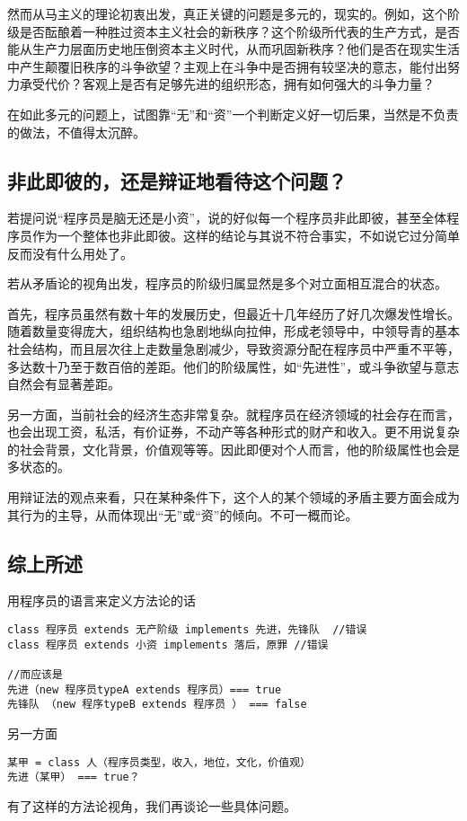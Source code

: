 \documentclass[punct=kaiming, zihao=5, openany, fontset=sikou]{ctexbook}
\begin{document}
然而从马主义的理论初衷出发，真正关键的问题是多元的，现实的。例如，这个阶级是否酝酿着一种胜过资本主义社会的新秩序？这个阶级所代表的生产方式，是否能从生产力层面历史地压倒资本主义时代，从而巩固新秩序？他们是否在现实生活中产生颠覆旧秩序的斗争欲望？主观上在斗争中是否拥有较坚决的意志，能付出努力承受代价？客观上是否有足够先进的组织形态，拥有如何强大的斗争力量？

在如此多元的问题上，试图靠“无”和“资”一个判断定义好一切后果，当然是不负责的做法，不值得太沉醉。

\subsection{非此即彼的，还是辩证地看待这个问题？}
若提问说“程序员是脑无还是小资”，说的好似每一个程序员非此即彼，甚至全体程序员作为一个整体也非此即彼。这样的结论与其说不符合事实，不如说它过分简单反而没有什么用处了。

若从矛盾论的视角出发，程序员的阶级归属显然是多个对立面相互混合的状态。

首先，程序员虽然有数十年的发展历史，但最近十几年经历了好几次爆发性增长。随着数量变得庞大，组织结构也急剧地纵向拉伸，形成老领导中，中领导青的基本社会结构，而且层次往上走数量急剧减少，导致资源分配在程序员中严重不平等，多达数十乃至于数百倍的差距。他们的阶级属性，如“先进性”，或斗争欲望与意志自然会有显著差距。

另一方面，当前社会的经济生态非常复杂。就程序员在经济领域的社会存在而言，也会出现工资，私活，有价证券，不动产等各种形式的财产和收入。更不用说复杂的社会背景，文化背景，价值观等等。因此即便对个人而言，他的阶级属性也会是多状态的。

用辩证法的观点来看，只在某种条件下，这个人的某个领域的矛盾主要方面会成为其行为的主导，从而体现出“无”或“资”的倾向。不可一概而论。

\subsection{综上所述}
用程序员的语言来定义方法论的话
\begin{verbatim}
class 程序员 extends 无产阶级 implements 先进，先锋队  //错误
class 程序员 extends 小资 implements 落后，原罪 //错误

//而应该是
先进（new 程序员typeA extends 程序员）=== true 
先锋队 （new 程序typeB extends 程序员 ） === false
\end{verbatim}
另一方面
\begin{verbatim}
某甲 = class 人（程序员类型，收入，地位，文化，价值观）
先进（某甲） === true？
\end{verbatim}
有了这样的方法论视角，我们再谈论一些具体问题。
\end{document}
